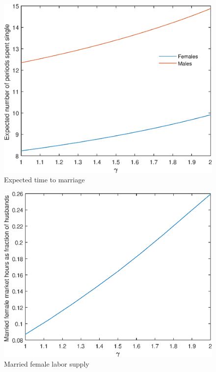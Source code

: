 \documentclass[12pt]{article}
\begin{document}
\begin{figure}
	\centering
	\caption{Expected time to marriage}
	\includegraphics{Graphs/exp_single_gamma_ex1.eps}
\end{figure}

\begin{figure}
	\centering
	\caption{Married female labor supply}
	\includegraphics{Graphs/lf_gamma_ex1.eps}
\end{figure}
\end{document}
